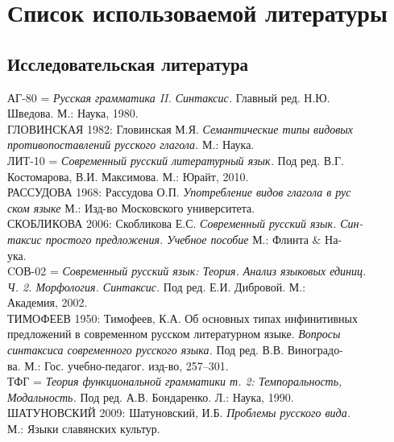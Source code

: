 \newcommand{\indenttext}{\hspace*{4ex}}
\newcommand{\cutline}{\\\indenttext}
\newcommand{\cutword}{-\cutline}

\section*{Список использоваемой литературы}
\setlength{\parindent}{0cm}
\begin{normalsize}
\subsection*{Исследовательская литература}
АГ-80 = \textit{Русская грамматика II. Синтаксис.} Главный ред. Н.Ю.\cutline Шведова. М.: Наука, 1980.\\
ГЛОВИНСКАЯ 1982: Гловинская М.Я. \textit{Семантические типы видовых\cutline противопоставлений русского глагола.} М.: Наука.\\
ЛИТ-10 = \textit{Современный русский литературный язык.} Под ред. В.Г.\cutline Костомарова, В.И. Максимова. М.: Юрайт, 2010.\\
РАССУДОВА 1968: Рассудова О.П. \textit{Употребление видов глагола в рус\cutline ском языке} М.: Изд-во Московского университета.\\
СКОБЛИКОВА 2006: Скобликова Е.С. \textit{Современный русский язык. Син\cutword таксис простого предложения. Учебное пособие} М.: Флинта \& На\cutword ука.\\
CОВ-02 = \textit{Современный русский язык: Теория. Анализ языковых единиц.\cutline Ч. 2. Морфология. Синтаксис.} Под ред. Е.И. Дибровой. М.:\cutline Академия, 2002.\\
ТИМОФЕЕВ 1950: Тимофеев, К.А. Об основных типах инфинитивных \indenttext предложений в современном русском литературном языке. \textit{Вопросы \cutline синтаксиса современного русского языка.} Под ред. В.В. Виноградо\cutword ва. М.: Гос. учебно-педагог. изд-во, 257--301.\\
ТФГ = \textit{Теория функциональной грамматики т. 2: Темпоральность, \cutline Модальность.} Под ред. А.В. Бондаренко. Л.: Наука, 1990.\\
ШАТУНОВСКИЙ 2009: Шатуновский, И.Б. \textit{Проблемы русского вида.} \cutline М.: Языки славянских культур.
\end{normalsize}